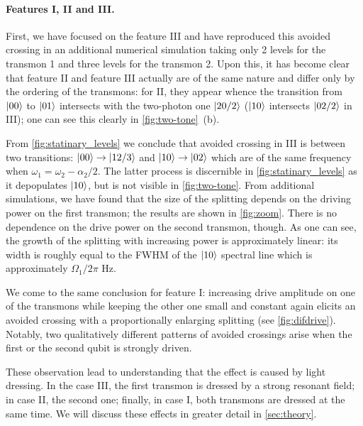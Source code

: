 \documentclass[%
 aip,
 amsmath,amssymb,
 reprint,%
]{revtex4-1}
\begin{document}
\paragraph{Features I, II and III.} First, we have focused on the feature III and have reproduced this avoided crossing in an additional numerical simulation taking only 2 levels for the transmon 1 and three levels for the transmon 2. Upon this, it has become clear that feature II and feature III actually are of the same nature and differ only by the ordering of the transmons: for II, they appear whence the transition from $\ket{00}$ to $\ket{01}$ intersects with the two-photon one $\ket{20/2}$ ($\ket{10}$ intersects $\ket{02/2}$ in III); one can see this clearly in \autoref{fig:two-tone}~(b).

From \autoref{fig:statinary_levels} we conclude that avoided crossing in III is between two transitions: $\ket{00}\rightarrow\ket{12/3}$ and $\ket{10}\rightarrow \ket{02}$ which are of the same frequency when $\omega_1 = \omega_2-\alpha_2/2$. The latter process is discernible in \autoref{fig:statinary_levels} as it depopulates $\ket{10}$, but is not visible in \autoref{fig:two-tone}. From additional simulations, we have found that the size of the splitting depends on the driving power on the first transmon; the results are shown in \autoref{fig:zoom}. There is no dependence on the drive power on the second transmon, though. As one can see, the growth of the splitting with increasing power is approximately linear: its width is roughly equal to the FWHM of the $\ket{10}$ spectral line which is approximately $\Omega_1/2\pi$ Hz. 

We come to the same conclusion for feature I: increasing drive amplitude on one of the transmons while keeping the other one small and constant again elicits an avoided crossing with a proportionally enlarging splitting (see \autoref{fig:difdrive}). Notably, two qualitatively different patterns of avoided crossings arise when the first or the second qubit is strongly driven.


These observation lead to understanding that the effect is caused by light dressing. In the case III, the first transmon is dressed by a strong resonant field; in case II, the second one; finally, in case I, both transmons are dressed at the same time. We will discuss these effects in greater detail in \autoref{sec:theory}.
\end{document}
